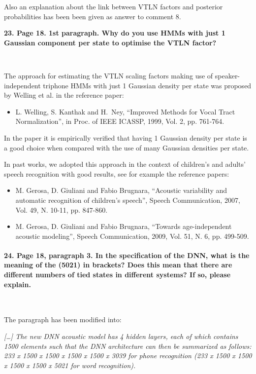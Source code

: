 \documentclass[]{article}
\begin{document}
Also an explanation about the link between VTLN factors and posterior probabilities has been been given as answer to comment 8.

\textbf{23. Page 18. 1st paragraph. Why do you use HMMs with just 1 Gaussian component per state to optimise the VTLN factor? }

~

The   approach  for  estimating   the  VTLN   scaling factors  making   use  of
speaker-independent  triphone  HMMs  with  just 1 Gaussian density  per  state  was
proposed by Welling et al. in the reference paper:
\begin{itemize}
\item L. Welling, S. Kanthak and  H.~Ney, ``Improved Methods for Vocal Tract                                              
Normalization'', in Proc. of IEEE ICASSP, 1999, Vol. 2, pp. 761-764.
\end{itemize}

In the paper it is empirically verified that having 1 Gaussian density
per state is a good  choice when compared
with the use of many Gaussian densities per state.

In past works, we  adopted this approach  in the context  of children's
and adults' speech recognition  with good results,  see for example  the reference
papers:

\begin{itemize}
\item M. Gerosa, D. Giuliani  and Fabio Brugnara, ``Acoustic variability and
automatic recognition of children's speech'', Speech Communication,
2007, Vol. 49, N. 10-11, pp. 847-860.
\item M. Gerosa, D. Giuliani and Fabio Brugnara, ``Towards age-independent acoustic modeling'',
Speech Communication, 2009, Vol. 51, N. 6, pp. 499-509.
\end{itemize}


\paragraph{24. Page 18, paragraph 3. In the specification of the DNN, what is the meaning of the (5021) in brackets? Does this mean that there are different numbers of tied states in different systems? If so, please explain.}

~

The paragraph has been modified into:

\textit{[\dots] The new DNN acoustic model  has 4 hidden layers,
each of  which contains 1500  elements such that the  DNN architecture
can then be summarized  as follows: 233 x 1500 x 1500  x 1500 x 1500 x
3039 for phone recognition (233 x 1500 x 1500  x 1500 x 1500 x 5021 for word recognition).}
\end{document}
